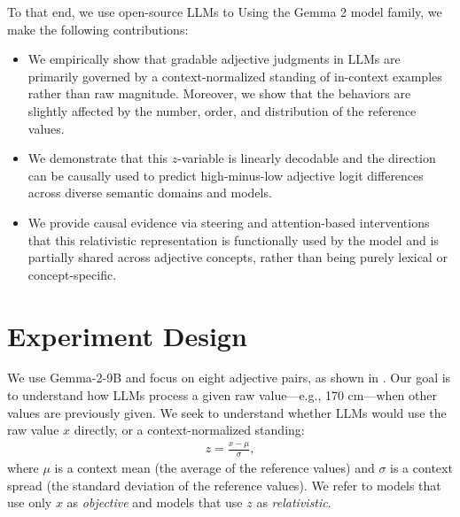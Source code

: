 \documentclass{article}
\begin{document}
To that end, we use open-source LLMs to
Using the Gemma 2 model family, we make the following contributions:
\begin{itemize}
    \item We empirically show that gradable adjective judgments in LLMs are primarily governed by a context-normalized standing of in-context examples rather than raw magnitude. Moreover, we show that the behaviors are slightly affected by the number, order, and distribution of the reference values.

    \item We demonstrate that this $z$-variable is linearly decodable and the direction can be causally used to predict high-minus-low adjective logit differences across diverse semantic domains and models.

    \item We provide causal evidence via steering and attention-based interventions that this relativistic representation is functionally used by the model and is partially shared across adjective concepts, rather than being purely lexical or concept-specific.
\end{itemize}

\section{Experiment Design}
\label{sec:experiment_design}
We use Gemma-2-9B \citep{gemma2_2024} and focus on eight adjective pairs, as shown in .
Our goal is to understand how LLMs process a given raw value---e.g., 170 cm---when other values are previously given.
We seek to understand whether LLMs would use the raw value $x$ directly, or a context-normalized standing:
\begin{align*}
    z = \frac{x-\mu}{\sigma},
\end{align*}
where $\mu$ is a context mean (the average of the reference values) and $\sigma$ is a context spread (the standard deviation of the reference values).
We refer to models that use only $x$ as \emph{objective} and models that use $z$ as \emph{relativistic}.
\end{document}
